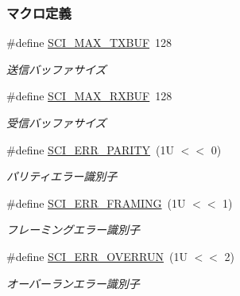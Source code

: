 \subsubsection*{マクロ定義}
\begin{DoxyCompactItemize}
\item 
\#define \hyperlink{sci_8h_a3215a6d64ad06026d58b5f2a823def50_a3215a6d64ad06026d58b5f2a823def50}{S\+C\+I\+\_\+\+M\+A\+X\+\_\+\+T\+X\+B\+U\+F}~128
\begin{DoxyCompactList}\small\item\em 送信バッファサイズ \end{DoxyCompactList}\item 
\#define \hyperlink{sci_8h_a6f5d317e038f60b708d778579f143874_a6f5d317e038f60b708d778579f143874}{S\+C\+I\+\_\+\+M\+A\+X\+\_\+\+R\+X\+B\+U\+F}~128
\begin{DoxyCompactList}\small\item\em 受信バッファサイズ \end{DoxyCompactList}\item 
\#define \hyperlink{sci_8h_a3ebdf406c8df76754b38447eb28a4281_a3ebdf406c8df76754b38447eb28a4281}{S\+C\+I\+\_\+\+E\+R\+R\+\_\+\+P\+A\+R\+I\+T\+Y}~(1\+U $<$$<$ 0)
\begin{DoxyCompactList}\small\item\em パリティエラー識別子 \end{DoxyCompactList}\item 
\#define \hyperlink{sci_8h_a77d50c920e6676c04c79fde16f1fc975_a77d50c920e6676c04c79fde16f1fc975}{S\+C\+I\+\_\+\+E\+R\+R\+\_\+\+F\+R\+A\+M\+I\+N\+G}~(1\+U $<$$<$ 1)
\begin{DoxyCompactList}\small\item\em フレーミングエラー識別子 \end{DoxyCompactList}\item 
\#define \hyperlink{sci_8h_a6797a01bd01e4173548063aa903a953f_a6797a01bd01e4173548063aa903a953f}{S\+C\+I\+\_\+\+E\+R\+R\+\_\+\+O\+V\+E\+R\+R\+U\+N}~(1\+U $<$$<$ 2)
\begin{DoxyCompactList}\small\item\em オーバーランエラー識別子 \end{DoxyCompactList}\end{DoxyCompactItemize}
